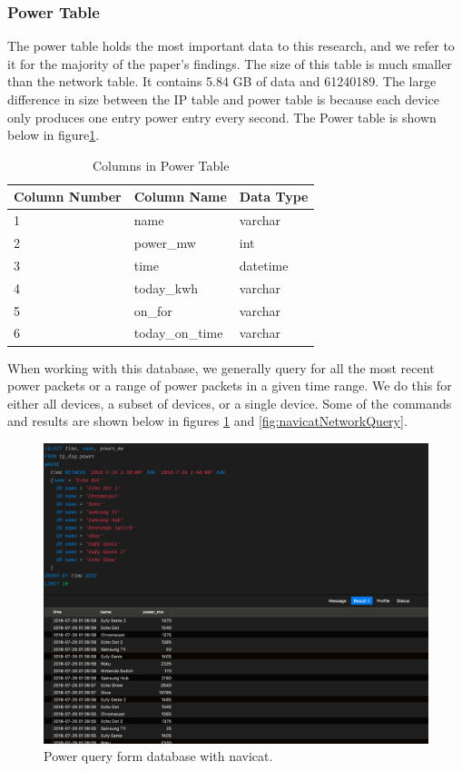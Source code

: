 \subsubsection{Power Table}

The power table holds the most important data to this research, and we refer to it for the majority of the paper's findings. The size of this table is much smaller than the network table. It contains 5.84 GB of data and 61240189. The large difference in size between the IP table and power table is because each device only produces one entry power entry every second. The Power table is shown below in figure\ref {tab:powcol}.

\begin{table}[H]
    \centering
    \caption{Columns in Power Table}
    \begin{tabular}{@{}lll@{}}
    \toprule
    Column Number & Column Name     & Data Type \\ \midrule
    1             & name            & varchar   \\
    2             & power\_mw       & int       \\
    3             & time            & datetime  \\
    4             & today\_kwh      & varchar   \\
    5             & on\_for         & varchar   \\
    6             & today\_on\_time & varchar
    \end{tabular}
    \label{tab:powcol}
    \end{table}

When working with this database, we generally query for all the most recent power packets or a range of power packets in a given time range. We do this for either all devices, a subset of devices, or a single device. Some of the commands and results are shown below in figures \ref{fig:navicatPowerQuery} and \ref{fig:navicatNetworkQuery}.

\begin{figure}[H]
    \centering
    \includegraphics[width=1\textwidth]{figures/navicatPowerQuery.png}
    \caption{Power query form database with navicat.}
    \label{fig:navicatPowerQuery}
\end{figure}

